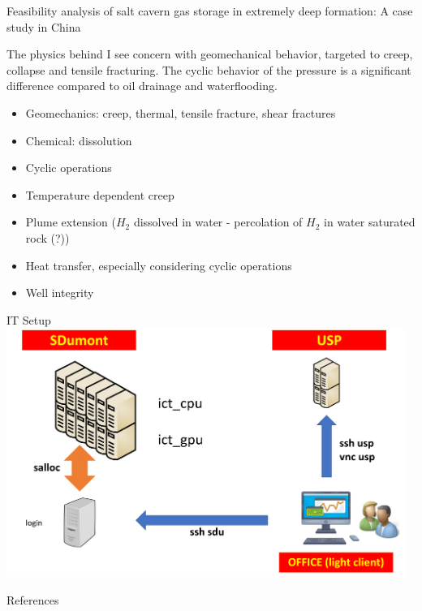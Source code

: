 \begin{frame}{\cite{zhao22} Feasibility analysis of salt cavern gas storage in extremely deep formation: A case study in China}
\end{frame}
%
%
\begin{frame}{The physics behind}
I see concern with geomechanical behavior, targeted to creep, collapse and tensile fracturing. The cyclic behavior of the pressure is a significant difference compared to oil drainage and waterflooding.
\begin{itemize}
\item Geomechanics: creep, thermal, tensile fracture, shear fractures
\item Chemical: dissolution
\item Cyclic operations
\item Temperature dependent creep
\item Plume extension ($H_2$ dissolved in water - percolation of $H_2$ in water saturated rock (?))
\item Heat transfer, especially considering cyclic operations
\item Well integrity
\end{itemize}
\end{frame}

\begin{frame}{IT Setup}
\includegraphics[width=13cm]{png/it_archit}
\end{frame}

\begin{frame}[shrink=50,fragile]{References}


\end{frame}
